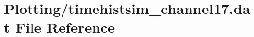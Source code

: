 \hypertarget{Plotting_2timehistsim__channel17_8dat}{}\section{Plotting/timehistsim\+\_\+channel17.dat File Reference}
\label{Plotting_2timehistsim__channel17_8dat}
